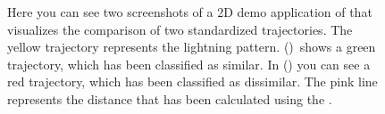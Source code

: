 \begin{figure}[!htbp]
    \centering
    \caption{
    Here you can see two screenshots of a 2D demo application of \trajecmp that visualizes the comparison of two standardized trajectories.
    The yellow trajectory represents the lightning pattern.
    ()~shows a green trajectory, which has been classified as similar.
    In () you can see a red trajectory, which has been classified as dissimilar.
    The pink line represents the distance that has been calculated using the \modifiedHausdorffDistFn.
    }
    \label{fig:deciding-similarity}
\end{figure}
